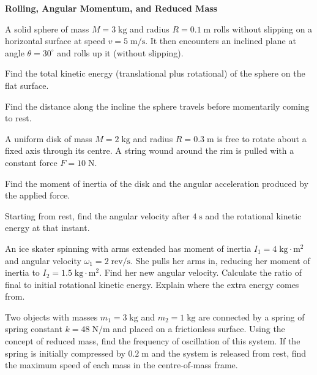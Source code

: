 \documentclass[12pt,a4paper]{article}
\begin{document}
\noindent\textbf{Rolling, Angular Momentum, and Reduced Mass}

\begin{parts}
\item A solid sphere of mass $M = 3\;\text{kg}$ and radius $R = 0.1\;\text{m}$ rolls without slipping on a horizontal surface at speed $v = 5\;\text{m/s}$. It then encounters an inclined plane at angle $\theta = 30^\circ$ and rolls up it (without slipping).
\begin{parts}
\item Find the total kinetic energy (translational plus rotational) of the sphere on the flat surface. 
\item Find the distance along the incline the sphere travels before momentarily coming to rest. 
\end{parts}

\item A uniform disk of mass $M = 2\;\text{kg}$ and radius $R = 0.3\;\text{m}$ is free to rotate about a fixed axis through its centre. A string wound around the rim is pulled with a constant force $F = 10\;\text{N}$.
\begin{parts}
\item Find the moment of inertia of the disk and the angular acceleration produced by the applied force. 
\item Starting from rest, find the angular velocity after $4\;\text{s}$ and the rotational kinetic energy at that instant. 
\end{parts}

\item An ice skater spinning with arms extended has moment of inertia $I_1 = 4\;\text{kg}\cdot\text{m}^2$ and angular velocity $\omega_1 = 2\;\text{rev/s}$. She pulls her arms in, reducing her moment of inertia to $I_2 = 1.5\;\text{kg}\cdot\text{m}^2$. Find her new angular velocity. Calculate the ratio of final to initial rotational kinetic energy. Explain where the extra energy comes from. 

\item Two objects with masses $m_1 = 3\;\text{kg}$ and $m_2 = 1\;\text{kg}$ are connected by a spring of spring constant $k = 48\;\text{N/m}$ and placed on a frictionless surface. Using the concept of reduced mass, find the frequency of oscillation of this system. If the spring is initially compressed by $0.2\;\text{m}$ and the system is released from rest, find the maximum speed of each mass in the centre-of-mass frame. 
\end{parts}
\end{document}
